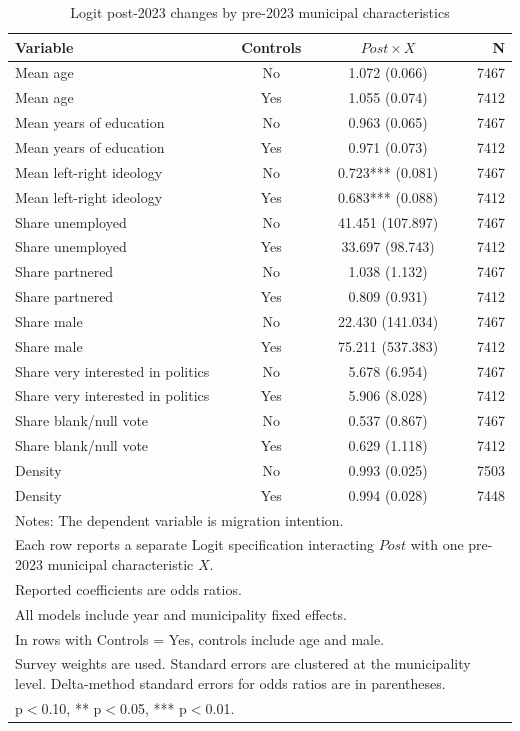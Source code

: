 \begin{table}[!htbp]
\centering
\caption{Logit post-2023 changes by pre-2023 municipal characteristics}
\label{tab:logit_post_x_key}
\small
\begin{tabular}{lccr}
\hline
Variable & Controls & $Post \times X$ & N \\
\hline
Mean age & No & 1.072 (0.066) & 7467 \\
Mean age & Yes & 1.055 (0.074) & 7412 \\
Mean years of education & No & 0.963 (0.065) & 7467 \\
Mean years of education & Yes & 0.971 (0.073) & 7412 \\
Mean left-right ideology & No & 0.723*** (0.081) & 7467 \\
Mean left-right ideology & Yes & 0.683*** (0.088) & 7412 \\
Share unemployed & No & 41.451 (107.897) & 7467 \\
Share unemployed & Yes & 33.697 (98.743) & 7412 \\
Share partnered & No & 1.038 (1.132) & 7467 \\
Share partnered & Yes & 0.809 (0.931) & 7412 \\
Share male & No & 22.430 (141.034) & 7467 \\
Share male & Yes & 75.211 (537.383) & 7412 \\
Share very interested in politics & No & 5.678 (6.954) & 7467 \\
Share very interested in politics & Yes & 5.906 (8.028) & 7412 \\
Share blank/null vote & No & 0.537 (0.867) & 7467 \\
Share blank/null vote & Yes & 0.629 (1.118) & 7412 \\
Density & No & 0.993 (0.025) & 7503 \\
Density & Yes & 0.994 (0.028) & 7448 \\
\hline
\multicolumn{4}{l}{\footnotesize Notes: The dependent variable is migration intention.} \\
\multicolumn{4}{l}{\footnotesize Each row reports a separate Logit specification interacting $Post$ with one pre-2023 municipal characteristic $X$.} \\
\multicolumn{4}{l}{\footnotesize Reported coefficients are odds ratios.} \\
\multicolumn{4}{l}{\footnotesize All models include year and municipality fixed effects.} \\
\multicolumn{4}{l}{\footnotesize In rows with Controls = Yes, controls include age and male.} \\
\multicolumn{4}{l}{\footnotesize Survey weights are used. Standard errors are clustered at the municipality level. Delta-method standard errors for odds ratios are in parentheses.} \\
\multicolumn{4}{l}{\footnotesize * p$<$0.10, ** p$<$0.05, *** p$<$0.01.} \\
\end{tabular}
\end{table}
